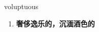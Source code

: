 
\begin{frame}
{\huge voluptuous}
\begin{center}
\begin{enumerate}\Large
  \item \textbf{奢侈逸乐的，沉湎酒色的}
\end{enumerate}
\end{center}
\end{frame}
